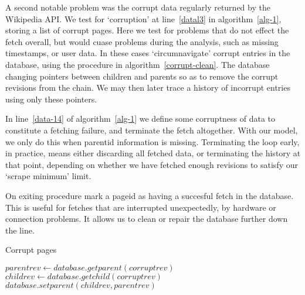 A second notable problem was the corrupt data regularly returned by
the Wikipedia API. We test for `corruption' at line~\ref{datal3} in
algorithm~\ref{alg-1}, storing a list of corrupt pages. Here we test
for problems that do not effect the fetch overall, but would cuase
problems during the analysis, such as missing timestamps, or user
data. In these cases `circumnavigate' corrupt entries in the database,
using the procedure in algorithm~\ref{corrupt-clean}. The database
changing pointers between children and parents so as to remove the
corrupt revisions from the chain. We may then later trace a history of
incorrupt entries using only these pointers.

In line~\ref{data-14} of algorithm~\ref{alg-1} we define some
corruptness of data to constitute a fetching failure, and terminate
the fetch altogether. With our model, we only do this when parentid
information is missing. Terminating the loop early, in practice, means
either discarding all fetched data, or terminating the history at that
point, depending on whether we have fetched enough revisions to
satisfy our `scrape minimum' limit.

On exiting procedure mark a pageid as having a succesful fetch in the
database. This is useful for fetches that are interrupted
unexpectedly, by hardware or connection problems. It allows us to
clean or repair the database further down the line.

\begin{algorithm}
  \caption{Corrupt pages}\label{corrupt-clean}
  \begin{algorithmic}
    \State $parentrev \gets database.getparent(corruptrev)$
    \State $childrev \gets database.getchild(corruptrev)$
    \State $database.setparent(childrev, parentrev)$ 
    \EndProcedure
  \end{algorithmic}
\end{algorithm}

